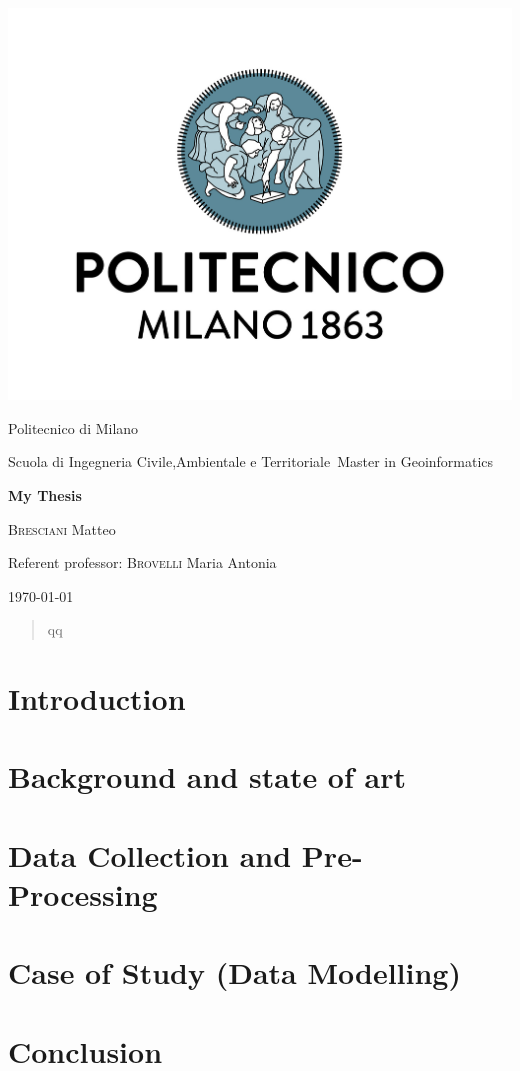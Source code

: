 \documentclass[fontsize=11pt,paper=a4,pagesize=auto]{report}
\begin{document}
\begin{titlepage}
	\centering
	\includegraphics[scale = 0.20]{images/polimi.jpg}\par
	{\Large
		Politecnico di Milano\par
		Scuola di Ingegneria Civile,Ambientale e Territoriale\
		Master in Geoinformatics\par}
			\vspace{0.5cm}
	{\huge\bfseries
		My Thesis\\\par}
	\vspace{1cm}
	{\Large
		{\scshape Bresciani} Matteo\par}
	\vfill
	Referent professor: {\scshape Brovelli} Maria Antonia\par
	\vfill
	{\large\today\par}
\end{titlepage}




\begin{abstract}

qq
\end{abstract}
\tableofcontents

\chapter{Introduction}
 

\chapter{Background and state of art}


\chapter{Data Collection and Pre-Processing}


\chapter{Case of Study (Data Modelling) }


\chapter{Conclusion}




       
\end{document}
